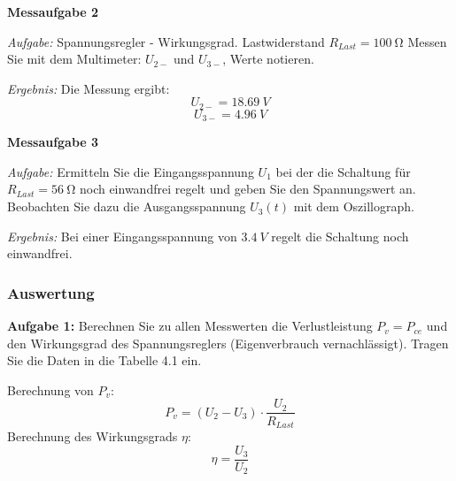 \documentclass[a4paper, 11pt,oneside]{article}
\begin{document}
	\textbf{Messaufgabe 2}
	
	\textit{Aufgabe:} Spannungsregler - Wirkungsgrad. Lastwiderstand $R_{Last} = \SI{100}{\ohm}$ Messen Sie mit dem Multimeter: $U_{2-}$ und $U_{3-}$, Werte notieren.
	
	\textit{Ergebnis:} Die Messung ergibt:
	$$U_{2-} = \SI{18,69}{V}$$
	$$U_{3-} = \SI{4,96}{V}$$
	
	\textbf{Messaufgabe 3}
	
	\textit{Aufgabe:} Ermitteln Sie die Eingangsspannung $U_1$ bei der die Schaltung für $R_{Last} = \SI{56}{\ohm}$ noch einwandfrei regelt und geben Sie den Spannungswert an. Beobachten Sie dazu die Ausgangsspannung $U_3(t)$ mit dem Oszillograph.
	
	\textit{Ergebnis:} Bei einer Eingangsspannung von $\SI{3,4}{V}$ regelt die Schaltung noch einwandfrei.
	
	\subsubsection{Auswertung}
	
	\textbf{Aufgabe 1:} Berechnen Sie zu allen Messwerten die Verlustleistung $P_v = P_{ce}$ und den Wirkungsgrad des Spannungsreglers (Eigenverbrauch vernachlässigt). Tragen Sie die Daten in die Tabelle 4.1 ein.
	
	Berechnung von $P_v$:
	$$ P_v = (U_2 - U_3) \cdot \frac{U_2}{R_{Last}} $$
	Berechnung des Wirkungsgrads $\eta$:
	$$ \eta = \frac{U_3}{U_2} $$
	
	
\end{document}
